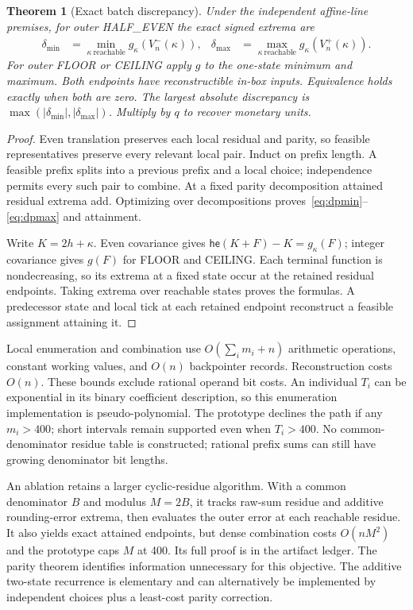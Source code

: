 \documentclass[11pt]{article}
\newtheorem{theorem}{Theorem}
\newcommand{\he}{\mathsf{he}}
\begin{document}
\begin{theorem}[Exact batch discrepancy]\label{thm:dp}
Under the independent affine-line premises, for outer HALF\_EVEN the exact signed extrema are
\begin{align*}
 \delta_{\min}&=\min_{\kappa\ \mathrm{reachable}}g_\kappa(V_n^-(\kappa)),&
 \delta_{\max}&=\max_{\kappa\ \mathrm{reachable}}g_\kappa(V_n^+(\kappa)).
\end{align*}
For outer FLOOR or CEILING apply $g$ to the one-state minimum and maximum. Both endpoints have reconstructible in-box inputs. Equivalence holds exactly when both are zero. The largest absolute discrepancy is $\max(|\delta_{\min}|,|\delta_{\max}|)$. Multiply by $q$ to recover monetary units.
\end{theorem}
\begin{proof}
Even translation preserves each local residual and parity, so feasible representatives preserve every relevant local pair. Induct on prefix length. A feasible prefix splits into a previous prefix and a local choice; independence permits every such pair to combine. At a fixed parity decomposition attained residual extrema add. Optimizing over decompositions proves~\eqref{eq:dpmin}--\eqref{eq:dpmax} and attainment.

Write $K=2h+\kappa$. Even covariance gives $\he(K+F)-K=g_\kappa(F)$; integer covariance gives $g(F)$ for FLOOR and CEILING. Each terminal function is nondecreasing, so its extrema at a fixed state occur at the retained residual endpoints. Taking extrema over reachable states proves the formulas. A predecessor state and local tick at each retained endpoint reconstruct a feasible assignment attaining it.
\end{proof}

Local enumeration and combination use $O(\sum_i m_i+n)$ arithmetic operations, constant working values, and $O(n)$ backpointer records. Reconstruction costs $O(n)$. These bounds exclude rational operand bit costs. An individual $T_i$ can be exponential in its binary coefficient description, so this enumeration implementation is pseudo-polynomial. The prototype declines the path if any $m_i>400$; short intervals remain supported even when $T_i>400$. No common-denominator residue table is constructed; rational prefix sums can still have growing denominator bit lengths.

An ablation retains a larger cyclic-residue algorithm. With a common denominator $B$ and modulus $M=2B$, it tracks raw-sum residue and additive rounding-error extrema, then evaluates the outer error at each reachable residue. It also yields exact attained endpoints, but dense combination costs $O(nM^2)$ and the prototype caps $M$ at 400. Its full proof is in the artifact ledger. The parity theorem identifies information unnecessary for this objective. The additive two-state recurrence is elementary and can alternatively be implemented by independent choices plus a least-cost parity correction.
\end{document}
